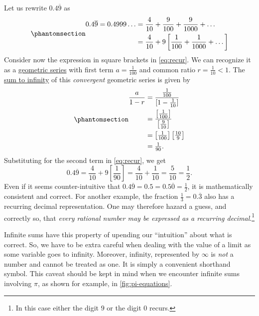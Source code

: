 \documentclass[
  a4paper,
]{article}
\begin{document}
Let us rewrite \(0.4\overline{9}\) as
\begin{equation}\phantomsection\label{eq:recur}{
\begin{aligned}
0.4\overline{9} = 0.4999\dots &= \frac{4}{10} + \frac{9}{100} + \frac{9}{1000} + \dots\\
&= \frac{4}{10} + 9\left[ \frac{1}{100} + \frac{1}{1000} + \dots\right]\\
\end{aligned}
}\end{equation} Consider now the expression in square brackets in
\cref{eq:recur}. We can recognize it as a
\href{https://mathworld.wolfram.com/GeometricSeries.html}{geometric
series} with first term \(a = \frac{1}{100}\) and common ratio
\(r = \frac{1}{10} < 1\). The
\href{https://senecalearning.com/en-GB/revision-notes/a-level/maths/edexcel/pure-maths/4-2-9-sum-to-infinity-of-a-geometric-series}{sum
to infinity} of this \emph{convergent} geometric series is given by
\begin{equation}\phantomsection\label{eq:sum}{
\begin{aligned}
\frac{a}{1 - r} &= \frac{\frac{1}{100}}{[1 - \frac{1}{10}]}\\
&= \frac{\left[\frac{1}{100}\right]}{\left[\frac{9}{10}\right]}\\
&= \left[\tfrac{1}{100}\right] \left[\tfrac{10}{9}\right]\\
& = \tfrac{1}{90}.
\end{aligned}
}\end{equation} Substituting for the second term in \cref{eq:recur}, we
get \[
0.4\overline{9} = \frac{4}{10} + 9\left[\frac{1}{90}\right] = \frac{4}{10} + \frac{1}{10} = \frac{5}{10} = \frac{1}{2}.
\] Even if it seems counter-intuitive that
\(0.4\overline{9} = 0.5 = 0.5\overline{0} = \frac{1}{2}\), it is
mathematically consistent and correct. For another example, the fraction
\(\frac{1}{3} = 0.\overline{3}\) also has a recurring decimal
representation. One may therefore hazard a guess, and correctly so, that
\emph{every rational number may be expressed as a recurring
decimal}.\footnote{In this case either the digit \(9\) or the digit
  \(0\) recurs.}

Infinite sums have this property of upending our ``intuition'' about
what is correct. So, we have to be extra careful when dealing with the
value of a limit as some variable goes to infinity. Moreover, infinity,
represented by \(\infty\) is \emph{not} a number and cannot be treated
as one. It is simply a convenient shorthand symbol. This caveat should
be kept in mind when we encounter infinite sums involving \(\pi\), as
shown for example, in \cref{fig:pi-equations}.
\end{document}
